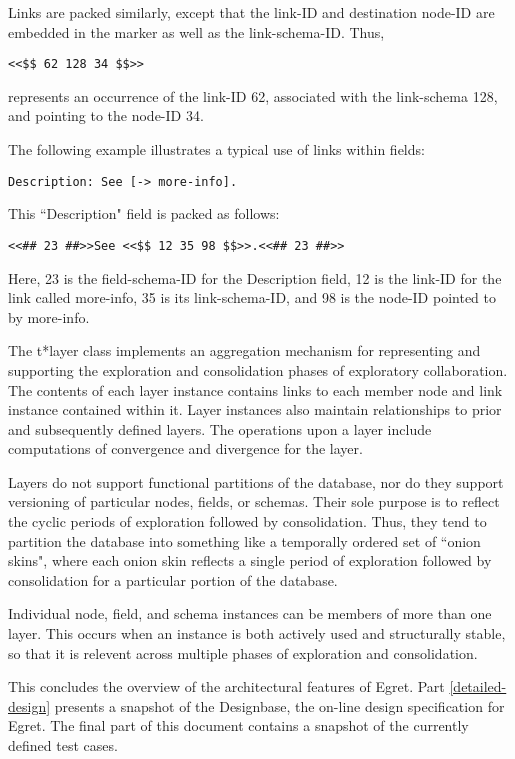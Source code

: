 Links are packed similarly, except that the link-ID
and destination node-ID are embedded in the marker as
well as the link-schema-ID. Thus,

\small\begin{verbatim}
<<$$ 62 128 34 $$>> 
\end{verbatim}\normalsize

represents an occurrence of the link-ID 62, associated
with the link-schema 128, and pointing to the node-ID
34.  

The following example illustrates a typical use of links
within fields:

\small\begin{verbatim}
Description: See [-> more-info]. 
\end{verbatim}\normalsize

This ``Description" field is packed as follows:

\small\begin{verbatim}
<<## 23 ##>>See <<$$ 12 35 98 $$>>.<<## 23 ##>>
\end{verbatim}\normalsize

Here, 23 is the field-schema-ID for the Description
field, 12 is the link-ID for the link called more-info,
35 is its link-schema-ID, and 98 is the node-ID pointed
to by more-info.

The {\sf t*layer} class implements an aggregation mechanism for representing
and supporting the exploration and consolidation phases of exploratory
collaboration. The contents of each layer instance contains links to each
member node and link instance contained within it. Layer instances also maintain
relationships to prior and subsequently defined layers.  The operations upon a
layer include computations of convergence and divergence for the layer.

Layers do not support functional partitions of the database, nor do
they support versioning of particular nodes, fields, or schemas.
Their sole purpose is to reflect the cyclic periods of exploration
followed by consolidation.  Thus, they tend to partition the database
into something like a temporally ordered set of ``onion skins", where
each onion skin reflects a single period of exploration followed by
consolidation for a particular portion of the database.

Individual node, field, and schema instances can be members of more than
one layer.  This occurs when an instance is both actively used and 
structurally stable, so that it is relevent across multiple phases
of exploration and consolidation.

This concludes the overview of the architectural features of Egret. 
Part \ref{detailed-design} presents a snapshot of the Designbase, the
on-line design specification for Egret.   The final part of this document
contains a snapshot of the currently defined test cases.
